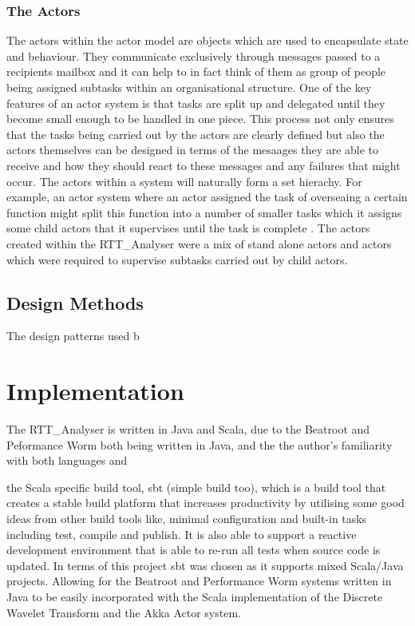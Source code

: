 \documentclass[a4paper, 11pt]{article}
\begin{document}
\subsubsection{The Actors}
The actors within the actor model are objects which are used to encapsulate state and behaviour. They communicate exclusively through messages passed to a recipients mailbox and it can help to in fact think of them as group of people being assigned subtasks within an organisational structure. One of the key features of an actor system is that tasks are split up and delegated until they become small enough to be handled in one piece. This process not only ensures that the tasks being carried out by the actors are clearly defined but also the actors themselves can be designed in terms of the mesaages they are able to receive and how they should react to these messages and any failures that might occur. The actors within a system will naturally form a set hierachy. For example, an actor system where an actor assigned the task of overseaing a certain function might split this function into a number of smaller tasks which it assigns some child actors that it supervises until the task is complete \cite{acotrsys}. The actors created within the RTT\_Analyser were a mix of stand alone actors and actors which were required to supervise subtasks carried out by child actors.

\subsection{Design Methods}
The design patterns used b     

\maketitle{} \section{Implementation}
The RTT\_Analyser is written in Java and Scala, due to the Beatroot and Peformance Worm both being written in Java, and the the author's familiarity with both languages and 

the Scala specific build tool, sbt (simple build too), which is a build tool that creates a stable build platform that increases productivity by utilising some good ideas from other build tools like, minimal configuration and built-in tasks including test, compile and publish. It is also able to support a reactive development environment that is able to re-run all tests when source code is updated\cite{sbt}. In terms of this project sbt was chosen as it supports mixed Scala/Java projects. Allowing for the Beatroot and Performance Worm systems written in Java to be easily incorporated with the Scala implementation of the Discrete Wavelet Transform and the Akka Actor system.
\end{document}
